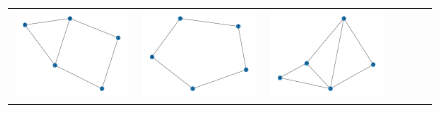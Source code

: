 \documentclass[11pt,a4paper,openright,oneside]{book}
\numberwithin{equation}{section}
\begin{document}
{\begin{figure}[h]
\begin{adjustwidth}{-3cm}{-3cm}
\begin{tabular}{>{\centering\arraybackslash}m{1.5cm} m{2.5cm} m{2.5cm} m{2.5cm} m{2.5cm} m{2.5cm}}
        \rule{0pt}{0.01cm} \includegraphics[width=\linewidth]{media/tnale/graph-1-tnale-8.png} \rule{0pt}{0.01cm}&
        \rule{0pt}{0.01cm} \includegraphics[width=\linewidth]{media/tnale/graph-2-tnale-8.png} \rule{0pt}{0.01cm}&
        \rule{0pt}{0.01cm} \includegraphics[width=\linewidth]{media/tnale/graph-3-tnale-8.png} \rule{0pt}{0.01cm}& 

\end{tabular}
\end{adjustwidth}
\end{figure}}
\end{document}
